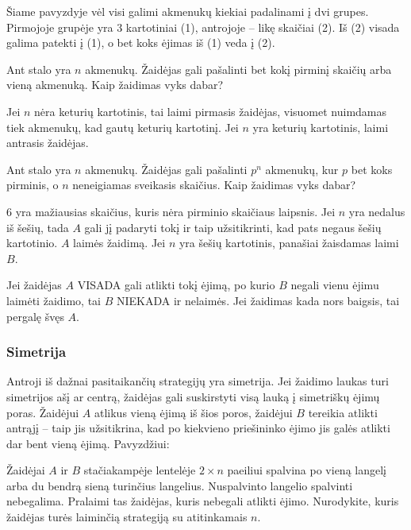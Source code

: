 Šiame pavyzdyje vėl visi galimi akmenukų kiekiai padalinami į dvi grupes.
Pirmojoje grupėje yra $3$ kartotiniai (1), antrojoje – likę skaičiai (2).
Iš (2) visada galima patekti į (1), o bet koks ėjimas iš (1) veda į (2).

\begin{pavnr}
  Ant stalo yra $n$ akmenukų. Žaidėjas gali pašalinti bet kokį pirminį skaičių
  arba vieną akmenuką. Kaip žaidimas vyks dabar?
\end{pavnr}

\begin{sprendimas}
  Jei $n$ nėra keturių kartotinis, tai laimi pirmasis žaidėjas, visuomet nuimdamas tiek
  akmenukų, kad gautų keturių kartotinį. Jei $n$ yra keturių kartotinis, laimi
  antrasis žaidėjas. 
\end{sprendimas}

\begin{pavnr}
  Ant stalo yra $n$ akmenukų. Žaidėjas gali pašalinti $p^n$ akmenukų, kur
  $p$ bet koks pirminis, o $n$ neneigiamas sveikasis  skaičius. Kaip
  žaidimas vyks dabar?  
\end{pavnr}

\begin{sprendimas}
  $6$ yra mažiausias skaičius, kuris nėra pirminio skaičiaus laipsnis. Jei $n$
  yra nedalus iš šešių, tada $A$ gali jį padaryti tokį ir taip užsitikrinti,
  kad pats negaus šešių kartotinio. $A$ laimės žaidimą. Jei $n$ yra šešių
  kartotinis, panašiai žaisdamas laimi $B$.
\end{sprendimas}

Jei žaidėjas $A$ VISADA gali atlikti tokį ėjimą, po kurio $B$ negali vienu
ėjimu laimėti žaidimo, tai $B$ NIEKADA ir nelaimės. Jei žaidimas kada nors
baigsis, tai pergalę švęs $A$. 

\subsubsection{Simetrija}

Antroji iš dažnai pasitaikančių strategijų yra simetrija.
Jei žaidimo laukas turi simetrijos ašį ar centrą, žaidėjas gali suskirstyti
visą lauką į simetriškų ėjimų poras. Žaidėjui $A$ atlikus vieną ėjimą iš šios
poros, žaidėjui $B$ tereikia atlikti antrąjį -- taip jis užsitikrina, kad po
kiekvieno priešininko ėjimo jis galės atlikti dar bent vieną ėjimą.
Pavyzdžiui:

\begin{pavnr}
  Žaidėjai $A$ ir $B$ stačiakampėje lentelėje $2\times n$ paeiliui spalvina po
  vieną langelį arba du bendrą sieną turinčius langelius. Nuspalvinto
  langelio spalvinti nebegalima. Pralaimi tas žaidėjas, kuris nebegali
  atlikti ėjimo. Nurodykite, kuris žaidėjas turės laiminčią strategiją su
  atitinkamais $n$. 
\end{pavnr}

